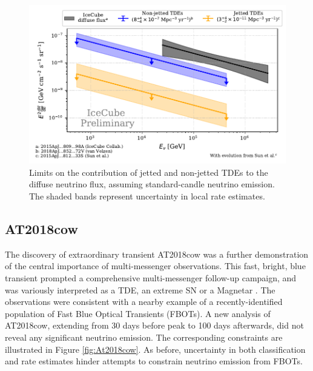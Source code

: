\documentclass{PoS}
\begin{document}
\begin{figure}[!ht]
	\centering \includegraphics[width=\textwidth]{figures/diffuse_flux_global_fit.pdf}
	\caption{Limits on the contribution of jetted and non-jetted TDEs to the diffuse neutrino flux, assuming standard-candle neutrino emission. The shaded bands represent uncertainty in local rate estimates.}
	\label{fig:DiffuseFlux}
\end{figure}

\subsection{AT2018cow}

The discovery of extraordinary transient AT2018cow was a further demonstration of the central importance of multi-messenger observations.  This fast, bright, blue transient prompted a comprehensive multi-messenger follow-up campaign, and was variously interpreted as a TDE, an extreme SN or a Magnetar \cite{Perley:2018oky}. The observations were consistent with a nearby example of a recently-identified population of Fast Blue Optical Transients (FBOTs). A new analysis of AT2018cow, extending from 30 days before peak to 100 days afterwards, did not reveal any significant neutrino emission. The corresponding constraints are illustrated in Figure \ref{fig:At2018cow}. As before, uncertainty in both classification and rate estimates hinder attempts to constrain neutrino emission from FBOTs.
\end{document}
